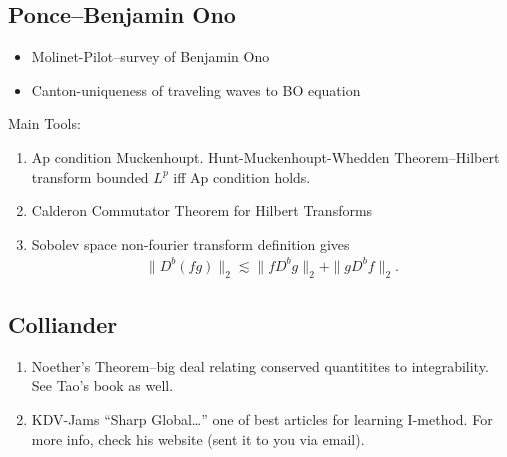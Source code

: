 \documentclass[12pt,reqno]{amsart}
\numberwithin{equation}{section}  %
\begin{document}
\subsection{Ponce--Benjamin Ono} 
\label{ssec:ponce-benono}
\begin{itemize}
    \item{}
    Molinet-Pilot--survey of Benjamin Ono
    \item{}
    Canton-uniqueness of traveling waves to BO equation
  \end{itemize}
  Main Tools:
\begin{enumerate}
\item{}
  Ap condition Muckenhoupt. Hunt-Muckenhoupt-Whedden Theorem--Hilbert transform bounded $L^{p}$ iff Ap condition holds.
  \item{}
  Calderon Commutator Theorem for Hilbert Transforms
  \item{}
  Sobolev space non-fourier transform definition gives
  \begin{equation*}
  \begin{split}
    \| D^{b}(fg) \|_{2} \lesssim \| fD^{b}g \|_{2} + \| gD^{b}f \|_{2}.
  \end{split}
  \end{equation*}
\end{enumerate}
  \subsection{Colliander} 
  \label{ssec:col-web}
  \begin{enumerate}
    \item{} Noether's Theorem--big deal relating conserved quantitites to integrability. See Tao's book as well.
    \item{} KDV-Jams ``Sharp Global\ldots'' one of best articles for learning I-method. For more info, check his website (sent it to you via email).
    \end{enumerate}
        
\end{document}
